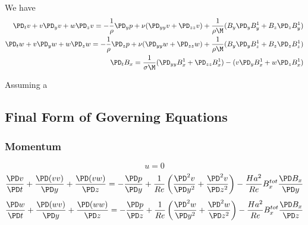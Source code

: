 \documentclass[11pt]{article}
\begin{document}
We have
\begin{equation}\begin{aligned}
\PD_t v+ v\PD_y v + w\PD_z v = -\frac{1}{\rho}\PD_y p+ \nu (\PD_{yy} v+\PD_{zz} v) + \frac{1}{\rho \M} (B_y \PD_y B_y^1 + B_z \PD_z B_y^1) \\
\PD_t w+ v\PD_y w + w\PD_z w = -\frac{1}{\rho}\PD_z p+ \nu (\PD_{yy} w+\PD_{zz} w) + \frac{1}{\rho \M} (B_y \PD_y B_z^1 + B_z \PD_z B_z^1) \\
\PD_t B_x = \frac{1}{\sigma \M} (\PD_{yy} B_x^1+\PD_{zz} B_x^1) - (v\PD_y B_x^1+w\PD_z B_x^1) \\
\end{aligned} \end{equation}

Assuming a 





\subsection{Final Form of Governing Equations}

\subsubsection{Momentum}
\begin{equation}
	u=0
\end{equation}
\begin{equation}
	\frac{\PD v}{\PD t}
	+ \frac{\PD (v v)}{\PD y}
	+ \frac{\PD (v w)}{\PD z}
	=
	- \frac{\PD p}{\PD y}
	+ \frac{1}{Re}
	\left(
	\frac{\PD^2 v}{\PD y^2}
	+\frac{\PD^2 v}{\PD z^2}
	\right)
	- \frac{Ha^2}{Re}
	B_x^{tot} \frac{\PD B_x}{\PD y}
\end{equation}
\begin{equation}
	\frac{\PD w}{\PD t}
	+ \frac{\PD (w v)}{\PD y}
	+ \frac{\PD (w w)}{\PD z}
	=
	- \frac{\PD p}{\PD z}
	+ \frac{1}{Re}
	\left(
	\frac{\PD^2 w}{\PD y^2}
	+\frac{\PD^2 w}{\PD z^2}
	\right)
	-\frac{Ha^2}{Re}
	B_x^{tot} \frac{\PD B_x}{\PD z}
\end{equation}
\end{document}
